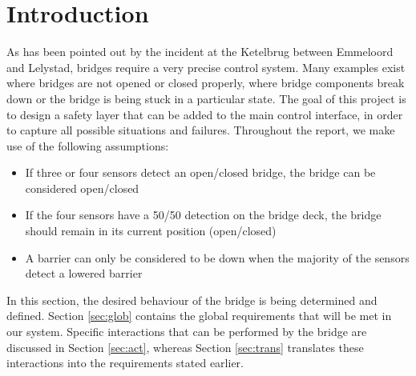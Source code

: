 \section{Introduction}

As has been pointed out by the incident at the Ketelbrug between Emmeloord and
Lelystad, bridges require a very precise control system.  Many examples exist
where bridges are not opened or closed properly, where bridge components break
down or the bridge is being stuck in a particular state. The goal of this
project is to design a safety layer that can be added to the main control
interface, in order to capture all possible situations and failures.
Throughout the report, we make use of the following assumptions:
%
\begin{itemize}
	\item If three or four sensors detect an open/closed bridge, the bridge can be considered open/closed
	\item If the four sensors	 have a 50/50 detection on the bridge deck, the bridge should remain in its current position (open/closed)
	\item A barrier can only be considered to be down when the majority of the sensors detect a lowered barrier
\end{itemize}
%
In this section, the desired behaviour of the bridge is being determined and defined. Section \ref{sec:glob} contains the global requirements that will be met in our system. Specific interactions that can be performed by the bridge are discussed in Section \ref{sec:act}, whereas Section \ref{sec:trans} translates these interactions into the requirements stated earlier.

